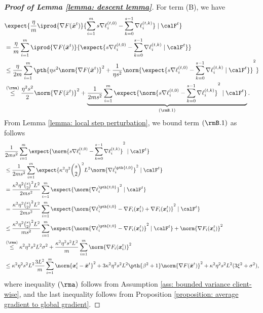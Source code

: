 \documentclass[letterpaper, 10 pt, conference]{ieeeconf}  %
\newcommand{\x}{{\bm x}}
\begin{document}
\begin{proof}[\bf Proof of Lemma \ref{lemma: descent lemma}]
For term (B), we have
\begin{align*}
&\expect{\frac{\eta}{m} \iprod{\nabla F(\bar{\x}^{t})}{\sum_{i=1}^m s \nabla \ell_i^{(t,0)} - \sum_{k=0}^{s-1} \nabla \ell_i^{(t,k)}} \mid \calF^{t}} \\
& = \frac{\eta}{m} \sum_{i=1}^m\iprod{\nabla F(\bar{\x}^{t})}{ \expect{ s \nabla \ell_i^{(t,0)} - \sum_{k=0}^{s-1} \nabla \ell_i^{(t,k)}\mid \calF^{t}}} \\
& \le \frac{\eta}{2m} \sum_{i=1}^m \pth{\eta s^2 \norm{\nabla F(\bar{\x}^{t})}^2 + \frac{1}{\eta s^2} \norm{\expect{ s \nabla \ell_i^{(t,0)} - \sum_{k=0}^{s-1} \nabla \ell_i^{(t,k)}\mid \calF^{t}}}^2 }  \\
& \overset{(\rma)}{\le} \frac{\eta^2 s^2}{2} \norm{\nabla F(\bar{x}^{t})}^2 + \underbrace{\frac{1}{2m s^2} \sum_{i=1}^m \expect{\norm{s \nabla \ell_i^{(t,0)} - \sum_{k=0}^{s-1} \nabla \ell_i^{(t,k)}}^2 \mid \calF^{t}}}_{(\rmB.1)}.  
\end{align*}
From Lemma \ref{lemma: local step perturbation}, we bound term $(\rmB.1)$ as follows  
\begin{align*}
&\frac{1}{2m s^2} \sum_{i=1}^m \expect{\norm{s \nabla \ell_i^{(t,0)} - \sum_{k=0}^{s-1} \nabla \ell_i^{(t,k)}}^2 \mid \calF^{t}} \\
& \le \frac{1}{2m s^2} \sum_{i=1}^m \expect{ \kappa^2 \eta^2 \binom{s}{2}^2 L^2\norm{\nabla \ell_{i}^{\pth{t,0}}}^2 \mid \calF^{t}} \\
& = \frac{\kappa^2 \eta^2 \binom{s}{2}^2 L^2}{2m s^2} \sum_{i=1}^m \expect{\norm{\nabla \ell_{i}^{\pth{t,0}}}^2 \mid \calF^{t}}\\
& = \frac{\kappa^2 \eta^2 \binom{s}{2}^2 L^2}{2m s^2} \sum_{i=1}^m \expect{\norm{\nabla \ell_{i}^{\pth{t,0}} - \nabla F_i(\x_i^t) + \nabla F_i(\x_i^t)}^2 \mid \calF^{t}} \\
& \le \frac{\kappa^2 \eta^2 \binom{s}{2}^2 L^2}{m s^2} \sum_{i=1}^m \expect{\norm{\nabla \ell_{i}^{\pth{t,0}} - \nabla F_i(\x_i^t)}^2\mid \calF^{t}} + \norm{\nabla F_i(\x_i^t)}^2\\
& \overset{(\rma)}{\le} \kappa^2 \eta^2 s^2 L^2 \sigma^2 + \frac{\kappa^2 \eta^2 s^2 L^2}{m} \sum_{i=1}^m\norm{\nabla F_i(\x_i^t)}^2\\
& \le \kappa^2 \eta^2 s^2 L^2 \frac{3L^2}{m} \sum_{i=1}^m \norm{\x_i^t - \bar{\x}^t}^2 + 3\kappa^2 \eta^2 s^2 L^2\pth{\beta^2 + 1}\norm{\nabla F(\bar{\x}^t)}^2 + \kappa^2 \eta^2 s^2 L^2 (3\xi^2 +\sigma^2), 
\end{align*}
where inequality $(\rma)$ follows from Assumption \ref{ass: bounded variance client-wise}, and the last inequality follows from Proposition \ref{proposition: average gradient to global gradient}. 

\end{proof}
\end{document}
